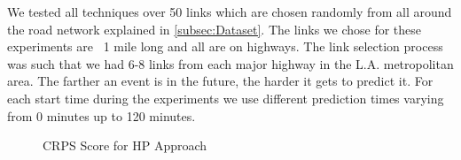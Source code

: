 We tested all techniques over 50 links which are chosen randomly from all around the road network explained in \cref{subsec:Dataset}. The links we chose for these experiments are ~1 mile long and all are on highways. The link selection process was such that we had 6-8 links from each major highway in the L.A. metropolitan area. The farther an event is in the future, the harder it gets to predict it. For each start time during the experiments we use different prediction times varying from 0 minutes up to 120 minutes.

\begin{figure}[h]
	\centering
	\caption{CRPS Score for HP Approach}\label{fig:HP}
\end{figure}

